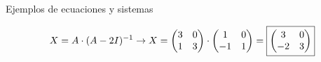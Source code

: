 \documentclass[11pt,a4paper]{article}
\newcommand{\fmdisp}[1]{\[\setbox2=\hbox{$\displaystyle #1$}\ifdim\wd2>\linewidth\resizebox{\linewidth}{!}{\box2}\else\box2\fi\]}
\begin{document}
\begin{fmex}{Ejemplos de ecuaciones y sistemas}
\begin{enumerate}[label=\textbf{\alph*)},leftmargin=*]
\fmdisp{X=A\cdot(A-2I)^{-1}\rightarrow X=\begin{pmatrix}3 & 0\\ 1 & 3\end{pmatrix}\cdot\begin{pmatrix}1 & 0\\ -1 & 1\end{pmatrix}=\boxed{\begin{pmatrix}3 & 0\\ -2 & 3\end{pmatrix}}}

\end{enumerate}
\end{fmex}
\end{document}

